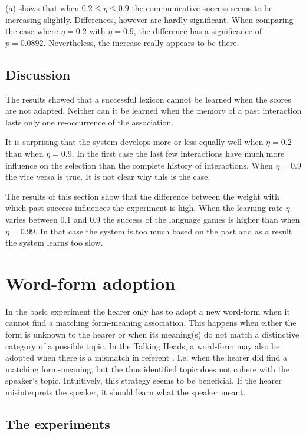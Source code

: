  (a) shows that  when $0.2 \leq \eta \leq 0.9$ the communicative success seems to be increasing slightly. Differences, however are hardly significant. When comparing the case where $\eta=0.2$ with $\eta=0.9$, the difference has a significance of $p=0.0892$. Nevertheless, the increase really appears to be there. 

\subsection{Discussion}

The results showed that a successful lexicon cannot be learned when the scores are not adapted. Neither can it be learned when the memory of a past interaction lasts only one re-occurrence of the association.

It is surprising that the system develops more or less equally well when $\eta=0.2$ than when $\eta=0.9$. In the first case the last few interactions have much more influence on the selection than the complete history of interactions. When $\eta=0.9$ the vice versa is true. It is not clear why this is the case.


The results of this section show that the difference between the weight with which past success influences the experiment is high. When the learning rate $\eta$ varies between 0.1 and 0.9 the success of the language games is higher than when $\eta=0.99$. In that case the system is too much based on the past and as a result the system learns too slow.


\section{Word-form adoption}\label{s:par:adopt}

In the basic experiment the hearer only has to adopt a new word-form when it cannot find a matching form-meaning association. This happens when either the form is unknown to the hearer or when its meaning(s) do not match a distinctive category of a possible topic. In the Talking Heads, a word-form may also be adopted when there is a mismatch in referent \citep{steels:2000}. I.e. when the hearer did find a matching form-meaning, but the thus identified topic does not cohere with the speaker's topic. Intuitively, this strategy seems to be beneficial. If the hearer misinterprets the speaker, it should learn what the speaker meant.

\subsection{The experiments}

